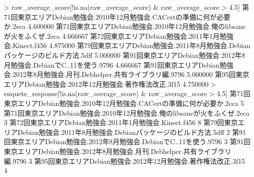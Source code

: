 \documentclass[mingoth,a4paper]{jsarticle}
\begin{document}
\begin{commandline}

>  raw_average_score[!is.na(raw_average_score) & raw_average_score > 4.5]
      第71回東京エリアDebian勉強会.2010年12月勉強会.CACertの準備に何が必要か.2eca 
                                                                         4.600000 
       第71回東京エリアDebian勉強会.2010年12月勉強会.俺のlibsaneが火をふくぜ.2eca 
                                                                         4.666667 
                         第72回東京エリアDebian勉強会.2011年1月勉強会.Kinect.f456 
                                                                         4.875000 
   第79回東京エリアDebian勉強会.2011年8月勉強会.Debianパッケージのビルド方法.5dff 
                                                                         5.000000 
            第91回東京エリアDebian勉強会.2012年8月勉強会.DebianでC..11を使う.9796 
                                                                         4.666667 
第91回東京エリアDebian勉強会.2012年8月勉強会.月刊.Debhelper.共有ライブラリ編.9796 
                                                                         5.000000 
                  第95回東京エリアDebian勉強会.2012年12月勉強会.著作権法改正.3f15 
                                                                         4.750000 
> enquete_response[!is.na(raw_average_score) & raw_average_score > 4.5]
      第71回東京エリアDebian勉強会.2010年12月勉強会.CACertの準備に何が必要か.2eca 
                                                                                5 
       第71回東京エリアDebian勉強会.2010年12月勉強会.俺のlibsaneが火をふくぜ.2eca 
                                                                                3 
                         第72回東京エリアDebian勉強会.2011年1月勉強会.Kinect.f456 
                                                                                8 
   第79回東京エリアDebian勉強会.2011年8月勉強会.Debianパッケージのビルド方法.5dff 
                                                                                2 
            第91回東京エリアDebian勉強会.2012年8月勉強会.DebianでC..11を使う.9796 
                                                                                3 
第91回東京エリアDebian勉強会.2012年8月勉強会.月刊.Debhelper.共有ライブラリ編.9796 
                                                                                3 
                  第95回東京エリアDebian勉強会.2012年12月勉強会.著作権法改正.3f15 
                                                                                4 
 
\end{commandline}
\end{document}
